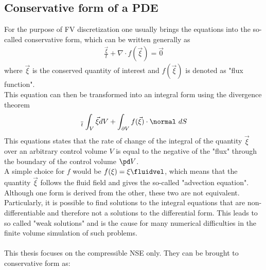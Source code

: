 \documentclass[../main.tex]{subfiles}
\begin{document}
\subsection{Conservative form of a \acl{PDE}}\label{sec:conservative_form_nsg}
For the purpose of \ac{FV} discretization one usually brings the equations into the so-called conservative form, which can be written generally as
\begin{align}\label{eq:conservative_form_general}
\tfrac{\vec{\xi}}{t}+\nabla\cdot f(\vec{\xi}) = \vec{0}
\end{align}
where $\vec{\xi}$ is the conserved quantity of interest and $f(\vec{\xi})$ is denoted as "flux function".\\
This equation can then be transformed into an integral form using the divergence theorem
\begin{align}\label{eq:conservation_form_integral}
\tfrac{~}{t}\int_{V} \vec{\xi} dV + \int_{\partial V} f(\vec{\xi})\cdot\normal~dS
\end{align}
This equations states that the rate of change of the integral of the quantity $\vec{\xi}$ over an arbitrary control volume $V$ is equal to the negative of the "flux" through the boundary of the control volume $\pd V$.\\
A simple choice for $f$ would be $f(\xi)=\xi\fluidvel$, which means that the quantity $\vec{\xi}$ follows the fluid field and gives the so-called "advection equation".\\
Although one form is derived from the other, these two are not equivalent. Particularly, it is possible to find solutions to the integral equations that are non-differentiable and therefore not a solutions to the differential form. This leads to so called "weak solutions" and is the cause for many numerical difficulties in the finite volume simulation of such problems.
 \\
 \\
This thesis focuses on the compressible \ac{NSE} only. They can be brought to conservative form as:
\end{document}
